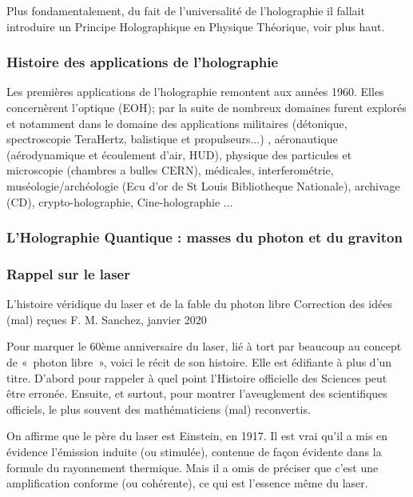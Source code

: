 \documentclass[a4paper,12pt]{article}
\begin{document}
Plus fondamentalement, du fait de l'universalité de l'holographie il fallait introduire un Principe Holographique en Physique Théorique, voir plus haut.




\subsubsection{Histoire des applications de l'holographie}

Les premières applications de l'holographie remontent aux années 1960. Elles concernèrent l'optique (EOH); par la suite de nombreux domaines furent explorés et notamment dans le domaine des applications militaires (détonique, spectroscopie TeraHertz, balistique et propulseurs...) \cite{ISL}, aéronautique (aérodynamique et écoulement d'air, HUD), physique des particules et microscopie (chambres a bulles CERN), médicales, interferométrie, muséologie/archéologie (Ecu d'or de St Louis Bibliotheque Nationale), archivage (CD), crypto-holographie, Cine-holographie \cite{Bjelkhagen} ...



\subsubsection{L'Holographie Quantique : masses du photon et du graviton}

\subsubsection{Rappel sur le laser}

L'histoire véridique du laser et de la fable du photon libre
Correction des idées (mal) reçues
F. M. Sanchez, janvier 2020

Pour marquer le 60ème anniversaire du laser, lié à tort par beaucoup au concept de « photon libre »,  voici le récit de son histoire. Elle est édifiante à plus d'un titre. D'abord pour rappeler à quel point l'Histoire officielle des Sciences peut être erronée. Ensuite, et surtout, pour montrer l'aveuglement des scientifiques officiels, le plus souvent des mathématiciens (mal) reconvertis.

On affirme que le père du laser est Einstein, en 1917. Il est vrai qu'il a mis en évidence l'émission induite (ou stimulée), contenue de façon évidente dans la formule du rayonnement thermique. Mais il a omis de préciser que c'est une amplification conforme (ou cohérente), ce qui est l'essence même du laser.
\end{document}
